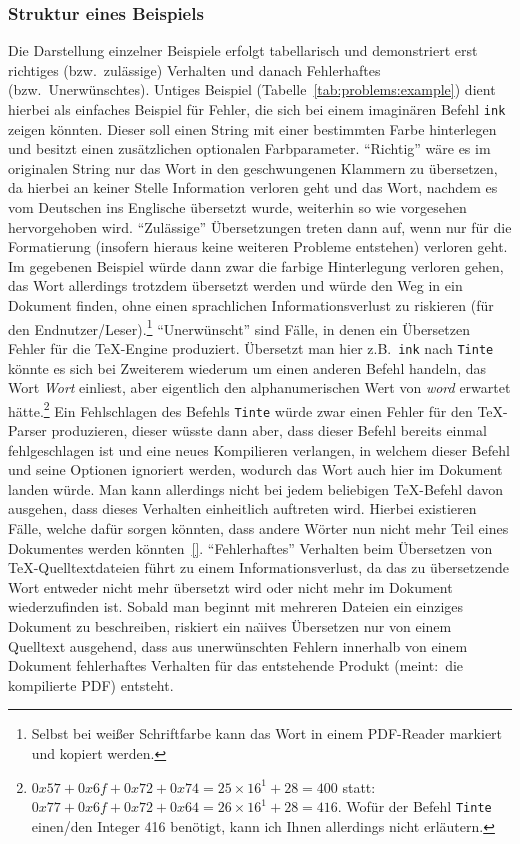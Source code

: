 \subsubsection*{Struktur eines Beispiels}
Die Darstellung einzelner Beispiele erfolgt tabellarisch und demonstriert erst richtiges (bzw.\ zulässige) Verhalten und danach Fehlerhaftes (bzw.\ Unerwünschtes). Untiges Beispiel (Tabelle~\ref{tab:problems:example}) dient hierbei als einfaches Beispiel für Fehler, die sich bei einem imaginären Befehl \texttt{ink} zeigen könnten. Dieser soll einen String mit einer bestimmten Farbe hinterlegen und besitzt einen zusätzlichen optionalen Farbparameter. 
\enquote{Richtig} wäre es im originalen String nur das Wort in den geschwungenen Klammern zu übersetzen, da hierbei an keiner Stelle Information verloren geht und das Wort, nachdem es vom Deutschen ins Englische übersetzt wurde, weiterhin so wie vorgesehen hervorgehoben wird.
\enquote{Zulässige} Übersetzungen treten dann auf, wenn nur für die Formatierung (insofern hieraus keine weiteren Probleme entstehen) verloren geht. Im gegebenen Beispiel würde dann zwar die farbige Hinterlegung verloren gehen, das Wort allerdings trotzdem übersetzt werden und würde den Weg in ein Dokument finden, ohne einen sprachlichen Informationsverlust zu riskieren (für den Endnutzer/Leser).\footnote{Selbst bei weißer Schriftfarbe kann das Wort in einem PDF-Reader markiert und kopiert werden.}
\enquote{Unerwünscht} sind Fälle, in denen ein Übersetzen Fehler für die \TeX{}-Engine produziert. Übersetzt man hier z.B.\ \texttt{ink} nach \texttt{Tinte} könnte es sich bei Zweiterem wiederum um einen anderen Befehl handeln, das Wort \textit{Wort} einliest, aber eigentlich den alphanumerischen Wert von \textit{word} erwartet hätte.\footnote{$0x57+0x6f + 0x72 + 0x74 = 25\times 16^1 + 28 = 400$ statt:\ $0x77+0x6f + 0x72 + 0x64 = 26\times 16^1 + 28 = 416$. Wofür der Befehl \texttt{Tinte} einen/den Integer 416 benötigt, kann ich Ihnen allerdings nicht erläutern.} Ein Fehlschlagen des Befehls \texttt{Tinte} würde zwar einen Fehler für den \TeX{}-Parser produzieren, dieser wüsste dann aber, dass dieser Befehl bereits einmal fehlgeschlagen ist und eine neues Kompilieren verlangen, in welchem dieser Befehl und seine Optionen ignoriert werden, wodurch das Wort auch hier im Dokument landen würde. Man kann allerdings nicht bei jedem beliebigen \TeX{}-Befehl davon ausgehen, dass dieses Verhalten einheitlich auftreten wird. Hierbei existieren Fälle, welche dafür sorgen könnten, dass andere Wörter nun nicht mehr Teil eines Dokumentes werden könnten~\ref{}.%
\enquote{Fehlerhaftes} Verhalten beim Übersetzen von \TeX{}-Quelltextdateien führt zu einem Informationsverlust, da das zu übersetzende Wort entweder nicht mehr übersetzt wird oder nicht mehr im Dokument wiederzufinden ist. Sobald man beginnt mit mehreren Dateien ein einziges Dokument zu beschreiben, riskiert ein na\"\i ives Übersetzen nur von einem Quelltext ausgehend, dass aus unerwünschten Fehlern innerhalb von einem Dokument fehlerhaftes Verhalten für das entstehende Produkt (meint:\ die kompilierte PDF) entsteht. 


